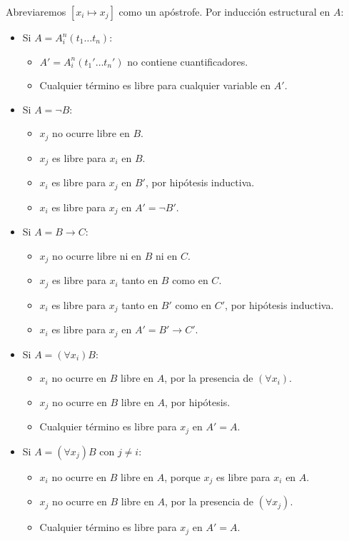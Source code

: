 \begin{solution}
Abreviaremos $[x_i \mapsto x_j]$ como un apóstrofe. Por inducción estructural en $A$:

\begin{itemize}
    \item Si $A = A_i^n(t_1 \dots t_n)$:
    \begin{itemize}
        \item $A' = A_i^n(t_1' \dots t_n')$ no contiene cuantificadores.
        \item Cualquier término es libre para cualquier variable en $A'$.
    \end{itemize}
    
    \item Si $A = \neg B$:
    \begin{itemize}
        \item $x_j$ no ocurre libre en $B$.
        \item $x_j$ es libre para $x_i$ en $B$.
        \item $x_i$ es libre para $x_j$ en $B'$, por hipótesis inductiva.
        \item $x_i$ es libre para $x_j$ en $A' = \neg B'$.
    \end{itemize}
    
    \item Si $A = B \to C$:
    \begin{itemize}
        \item $x_j$ no ocurre libre ni en $B$ ni en $C$.
        \item $x_j$ es libre para $x_i$ tanto en $B$ como en $C$.
        \item $x_i$ es libre para $x_j$ tanto en $B'$ como en $C'$, por hipótesis inductiva.
        \item $x_i$ es libre para $x_j$ en $A' = B' \to C'$.
    \end{itemize}
    
    \item Si $A = (\forall x_i) B$:
    \begin{itemize}
        \item $x_i$ no ocurre en $B$ libre en $A$, por la presencia de $(\forall x_i)$.
        \item $x_j$ no ocurre en $B$ libre en $A$, por hipótesis.
        \item Cualquier término es libre para $x_j$ en $A' = A$.
    \end{itemize}
    
    \item Si $A = (\forall x_j) B$ con $j \ne i$:
    \begin{itemize}
        \item $x_i$ no ocurre en $B$ libre en $A$, porque $x_j$ es libre para $x_i$ en $A$.
        \item $x_j$ no ocurre en $B$ libre en $A$, por la presencia de $(\forall x_j)$.
        \item Cualquier término es libre para $x_j$ en $A' = A$.
    \end{itemize}
    

\end{itemize}
\end{solution}
